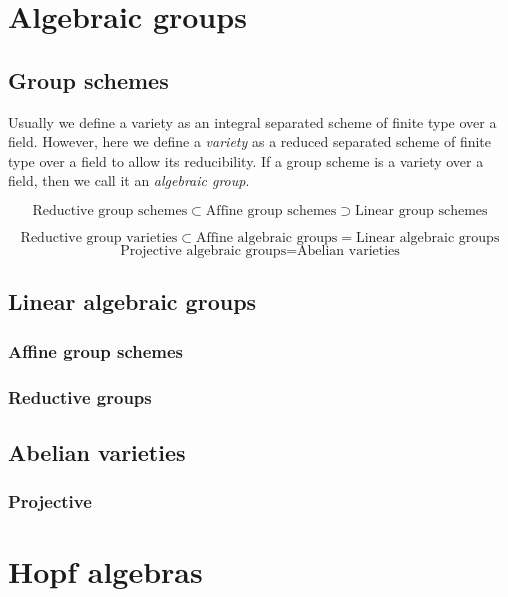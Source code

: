 \documentclass{../../large}
\begin{document}
\part{Algebraic groups}
\chapter{Group schemes}

Usually we define a variety as an integral separated scheme of finite type over a field.
However, here we define a \emph{variety} as a reduced separated scheme of finite type over a field to allow its reducibility.
If a group scheme is a variety over a field, then we call it an \emph{algebraic group}.


\[\text{Reductive group schemes}
\subset\text{Affine group schemes}
\supset\text{Linear group schemes}\]

\[\text{Reductive group varieties}
\subset\text{Affine algebraic groups}
=\text{Linear algebraic groups}\]
\[\text{Projective algebraic groups}=\text{Abelian varieties}\]





\chapter{Linear algebraic groups}

\section{Affine group schemes}

\section{Reductive groups}





\chapter{Abelian varieties}

\section{Projective}


\part{Hopf algebras}
\end{document}
